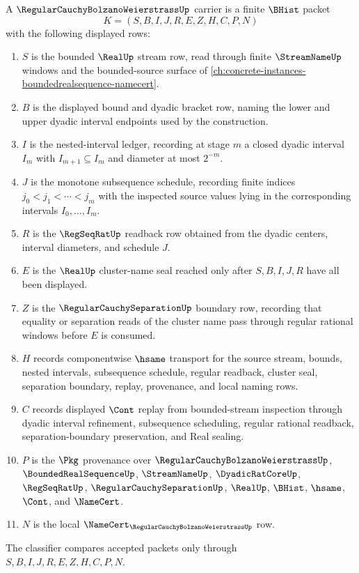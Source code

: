 \begin{definition}
\label{def:regular-cauchy-bolzano-weierstrass-carrier}
A $\RegularCauchyBolzanoWeierstrassUp$ carrier is a finite $\BHist$ packet
$$
K=(S,B,I,J,R,E,Z,H,C,P,N)
$$
with the following displayed rows:
\begin{enumerate}
\item $S$ is the bounded $\RealUp$ stream row, read through finite $\StreamNameUp$ windows and the bounded-source surface of \autoref{ch:concrete-instances-boundedrealsequence-namecert}.
\item $B$ is the displayed bound and dyadic bracket row, naming the lower and upper dyadic interval endpoints used by the construction.
\item $I$ is the nested-interval ledger, recording at stage $m$ a closed dyadic interval $I_m$ with $I_{m+1}\subseteq I_m$ and diameter at most $2^{-m}$.
\item $J$ is the monotone subsequence schedule, recording finite indices $j_0<j_1<\cdots<j_m$ with the inspected source values lying in the corresponding intervals $I_0,\ldots,I_m$.
\item $R$ is the $\RegSeqRatUp$ readback row obtained from the dyadic centers, interval diameters, and schedule $J$.
\item $E$ is the $\RealUp$ cluster-name seal reached only after $S,B,I,J,R$ have all been displayed.
\item $Z$ is the $\RegularCauchySeparationUp$ boundary row, recording that equality or separation reads of the cluster name pass through regular rational windows before $E$ is consumed.
\item $H$ records componentwise $\hsame$ transport for the source stream, bounds, nested intervals, subsequence schedule, regular readback, cluster seal, separation boundary, replay, provenance, and local naming rows.
\item $C$ records displayed $\Cont$ replay from bounded-stream inspection through dyadic interval refinement, subsequence scheduling, regular rational readback, separation-boundary preservation, and Real sealing.
\item $P$ is the $\Pkg$ provenance over $\RegularCauchyBolzanoWeierstrassUp$, $\BoundedRealSequenceUp$, $\StreamNameUp$, $\DyadicRatCoreUp$, $\RegSeqRatUp$, $\RegularCauchySeparationUp$, $\RealUp$, $\BHist$, $\hsame$, $\Cont$, and $\NameCert$.
\item $N$ is the local $\NameCert_{\RegularCauchyBolzanoWeierstrassUp}$ row.
\end{enumerate}
The classifier compares accepted packets only through $S,B,I,J,R,E,Z,H,C,P,N$.
\end{definition}

